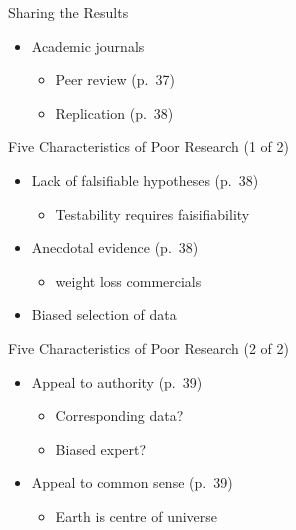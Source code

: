 \documentclass[
]{book}
\providecommand{\tightlist}{%
  \setlength{\itemsep}{0pt}\setlength{\parskip}{0pt}}
\begin{document}
Sharing the Results

\begin{itemize}
\tightlist
\item
  Academic journals

  \begin{itemize}
  \tightlist
  \item
    Peer review (p.~37)\\
  \item
    Replication (p.~38)
  \end{itemize}
\end{itemize}

Five Characteristics of Poor Research (1 of 2)

\begin{itemize}
\tightlist
\item
  Lack of falsifiable hypotheses (p.~38)

  \begin{itemize}
  \tightlist
  \item
    Testability requires faisifiability\\
  \end{itemize}
\item
  Anecdotal evidence (p.~38)

  \begin{itemize}
  \tightlist
  \item
    weight loss commercials\\
  \end{itemize}
\item
  Biased selection of data
\end{itemize}

Five Characteristics of Poor Research (2 of 2)

\begin{itemize}
\tightlist
\item
  Appeal to authority (p.~39)

  \begin{itemize}
  \tightlist
  \item
    Corresponding data?\\
  \item
    Biased expert?\\
  \end{itemize}
\item
  Appeal to common sense (p.~39)

  \begin{itemize}
  \tightlist
  \item
    Earth is centre of universe
  \end{itemize}
\end{itemize}
\end{document}
